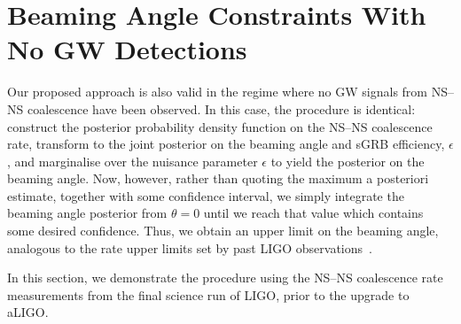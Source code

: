 \documentclass[twocolumn,nofootinbib]{revtex4-1}
\newcommand{\BNS}{\ac{NS}--\ac{NS}\xspace}
\newcommand{\arw}[1]{{\color{dgreen}{#1}}}
\begin{document}
\section{Beaming Angle Constraints With No \ac{GW} Detections}
\label{sec:beaming_limits}
Our proposed approach is also valid in the regime where no \ac{GW} signals from \BNS coalescence have been observed.
In this case, the procedure is identical: construct the posterior probability density function on the \BNS coalescence rate, transform to the joint posterior on the beaming angle and \ac{sGRB} efficiency, $\epsilon$, and marginalise over the nuisance parameter $\epsilon$ to yield the posterior on the beaming angle.
Now, however, rather than quoting the maximum a posteriori estimate, together with some confidence interval, we simply integrate the beaming angle posterior from $\theta=0$ until we reach that value which contains some desired confidence.
Thus, we obtain an upper limit on the beaming angle, analogous to the rate upper limits set by past LIGO observations~\cite{S6lowmass}.

In this section, we demonstrate the procedure using the \BNS coalescence rate measurements from the final science run of LIGO, prior to the upgrade to aLIGO.

\arw{Here, and elsewhere, we should change to using O1 upper limits.}
\end{document}
